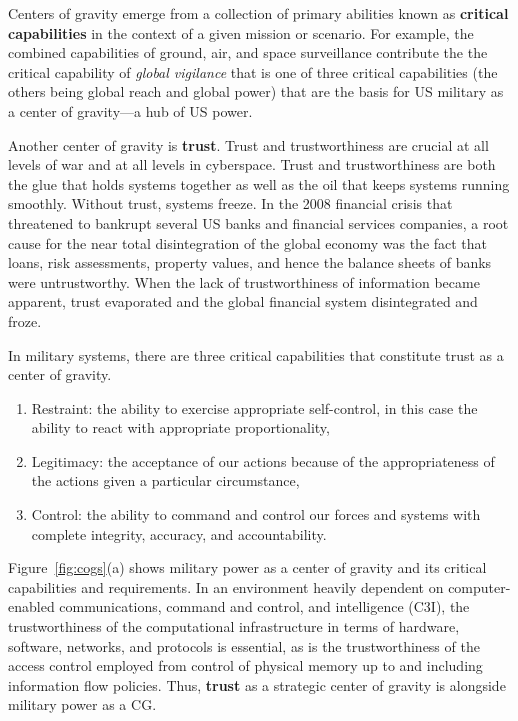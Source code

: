 \documentclass[10pt,twoside]{article}
\begin{document}
Centers of gravity emerge from a collection of primary abilities known
as \textbf{critical capabilities} in the context of a given mission or
scenario.  For example, the combined capabilities of ground, air, and
space surveillance contribute the the critical capability of
\emph{global vigilance} that is one of three critical capabilities
(the others being global reach and global power) that are the basis
for US military as a center of gravity---a hub of US power.

Another center of gravity is \textbf{trust}. Trust and trustworthiness
are crucial at all levels of war and at all levels in
cyberspace. Trust and trustworthiness are both the glue that holds
systems together as well as the oil that keeps systems running
smoothly.  Without trust, systems freeze. In the 2008 financial crisis
that threatened to bankrupt several US banks and financial services
companies, a root cause for the near total disintegration of the
global economy was the fact that loans, risk assessments, property
values, and hence the balance sheets of banks were untrustworthy. When
the lack of trustworthiness of information became apparent, trust
evaporated and the global financial system disintegrated and froze.

In military systems, there are three critical capabilities that
constitute trust as a center of gravity.
\begin{enumerate}
\item Restraint: the ability to exercise appropriate self-control, in
  this case the ability to react with appropriate proportionality,
\item Legitimacy: the acceptance of our actions because of the
  appropriateness of the actions given a particular circumstance,
\item Control: the ability to command and control our forces and
  systems with complete integrity, accuracy, and accountability.
\end{enumerate}
Figure~\ref{fig:cogs}(a) shows military power as a center of gravity
and its critical capabilities and requirements. In an environment
heavily dependent on computer-enabled communications, command and
control, and intelligence (C3I), the trustworthiness of the
computational infrastructure in terms of hardware, software, networks,
and protocols is essential, as is the trustworthiness of the
access control employed from control of physical memory up to and
including information flow policies. Thus, \textbf{trust} as a
strategic center of gravity is alongside military power as a CG.
\end{document}
